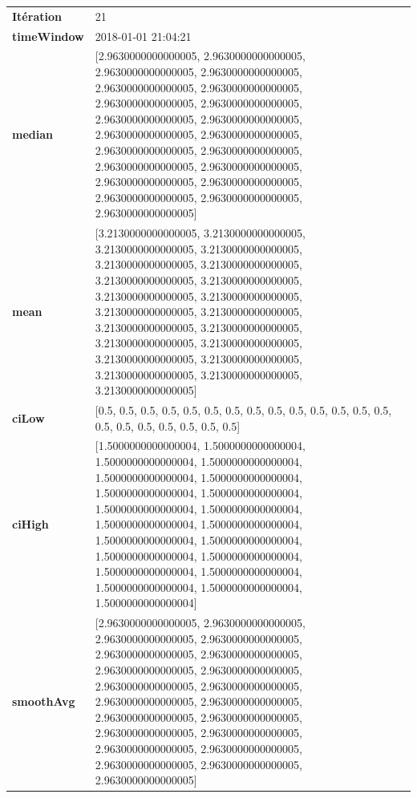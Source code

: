 \begin{table}[H]
	\centering
	\begin{tabularx}{\textwidth}{lX}
		\textbf{Itération}& 21\\
		\textbf{timeWindow} &2018-01-01 21:04:21 \\ 
		\textbf{median}& [2.9630000000000005, 2.9630000000000005, 2.9630000000000005, 2.9630000000000005, 2.9630000000000005, 2.9630000000000005, 2.9630000000000005, 2.9630000000000005, 2.9630000000000005, 2.9630000000000005, 2.9630000000000005, 2.9630000000000005, 2.9630000000000005, 2.9630000000000005, 2.9630000000000005, 2.9630000000000005, 2.9630000000000005, 2.9630000000000005, 2.9630000000000005, 2.9630000000000005, 2.9630000000000005] \\
		\textbf{mean} & [3.2130000000000005, 3.2130000000000005, 3.2130000000000005, 3.2130000000000005, 3.2130000000000005, 3.2130000000000005, 3.2130000000000005, 3.2130000000000005, 3.2130000000000005, 3.2130000000000005, 3.2130000000000005, 3.2130000000000005, 3.2130000000000005, 3.2130000000000005, 3.2130000000000005, 3.2130000000000005, 3.2130000000000005, 3.2130000000000005, 3.2130000000000005, 3.2130000000000005, 3.2130000000000005] \\
		\textbf{ciLow}& [0.5, 0.5, 0.5, 0.5, 0.5, 0.5, 0.5, 0.5, 0.5, 0.5, 0.5, 0.5, 0.5, 0.5, 0.5, 0.5, 0.5, 0.5, 0.5, 0.5, 0.5] \\
		\textbf{ciHigh}& [1.5000000000000004, 1.5000000000000004, 1.5000000000000004, 1.5000000000000004, 1.5000000000000004, 1.5000000000000004, 1.5000000000000004, 1.5000000000000004, 1.5000000000000004, 1.5000000000000004, 1.5000000000000004, 1.5000000000000004, 1.5000000000000004, 1.5000000000000004, 1.5000000000000004, 1.5000000000000004, 1.5000000000000004, 1.5000000000000004, 1.5000000000000004, 1.5000000000000004, 1.5000000000000004] \\
		\textbf{smoothAvg}&  [2.9630000000000005, 2.9630000000000005, 2.9630000000000005, 2.9630000000000005, 2.9630000000000005, 2.9630000000000005, 2.9630000000000005, 2.9630000000000005, 2.9630000000000005, 2.9630000000000005, 2.9630000000000005, 2.9630000000000005, 2.9630000000000005, 2.9630000000000005, 2.9630000000000005, 2.9630000000000005, 2.9630000000000005, 2.9630000000000005, 2.9630000000000005, 2.9630000000000005, 2.9630000000000005] \\
		
			\end{tabularx} 
		\end{table}
		
